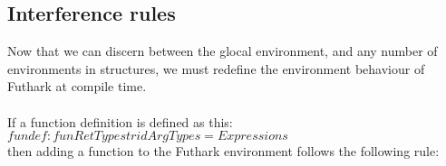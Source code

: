 \subsection{Interference rules}
Now that we can discern between the glocal environment, and any number of
environments in structures, we must redefine the environment behaviour of Futhark at compile time.
\\
\\
If a function definition is defined as this:
\\
$fundef : fun RetType strid ArgTypes = Expressions$
\\ then adding a function to the Futhark environment follows the following rule:
\begin{prooftree}
\end{prooftree}
  \\
